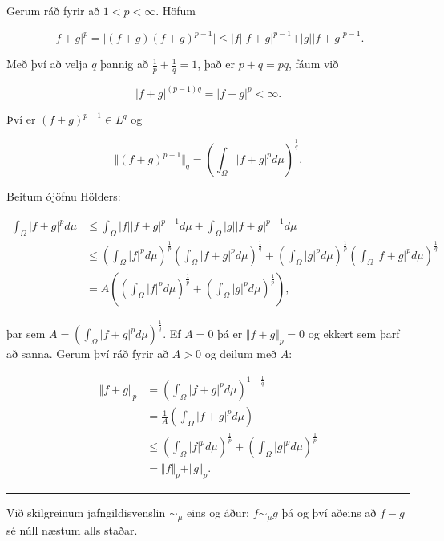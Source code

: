 \documentclass[]{book}
\begin{document}
Gerum ráð fyrir að \(1 < p < \infty\). Höfum

\[
\vert f + g\vert^p =\vert(f + g)(f + g)^{p-1}\vert\leq\vert f\vert\vert f + g\vert^{p-1} + \vert g\vert\vert f + g\vert^{p - 1}.
\]

Með því að velja \(q\) þannig að \(\frac1p + \frac1q = 1\), það er \(p + q = pq\), fáum við

\[
\vert f + g\vert^{(p-1)q} = \vert f + g\vert^p < \infty.
\]

Því er \((f + g)^{p-1}\in L^q\) og

\[
\Vert(f+g)^{p-1}\Vert_q = \left(\int_\Omega\vert f + g\vert^p d\mu \right)^{\frac1q}.
\]

Beitum ójöfnu Hölders:

\[
\begin{aligned}
\int_\Omega\vert f + g\vert^p d\mu &\leq 
\int_\Omega\vert f\vert\vert f + g\vert^{p-1}d\mu + \int_\Omega\vert g\vert\vert f + g\vert^{p-1}d\mu \\
&\leq \left(\int_\Omega \vert f\vert^pd\mu\right)^{\frac1p}\left(\int_\Omega\vert f + g\vert^pd\mu\right)^{\frac 1q}
+ \left(\int_\Omega \vert g\vert^pd\mu\right)^{\frac1p}\left(\int_\Omega\vert f + g\vert^pd\mu\right)^{\frac 1q} \\
&= A\left(\left(\int_\Omega\vert f\vert^pd\mu   \right)^{\frac1p} + \left(\int_\Omega\vert g\vert^pd\mu\right)^{\frac1p}\right),
\end{aligned}
\]

þar sem \(A = \left(\int_\Omega\vert f + g\vert^pd\mu\right)^{\frac1q}\). Ef \(A=0\) þá er \(\Vert f + g\Vert_p = 0\) og ekkert sem þarf að sanna. Gerum því ráð fyrir að \(A>0\) og deilum með \(A\):

\[
\begin{aligned}
\Vert f + g\Vert_p &= \left(\int_\Omega\vert f + g\vert^pd\mu\right)^{1 - \frac1q} \\
&= \frac1A\left(\int_\Omega\vert f + g\vert^pd\mu\right) \\
&\leq \left(\int_\Omega\vert f\vert^pd\mu\right)^{\frac1p} + \left(\int_\Omega\vert g\vert^pd\mu\right)^{\frac1p} \\
&= \Vert f\Vert_p + \Vert g\Vert_p.
\end{aligned}
\]

\begin{center}\rule{0.5\linewidth}{\linethickness}\end{center}

Við skilgreinum jafngildisvenslin \(\sim_\mu\) eins og áður: \(f\sim_\mu g\) þá og því aðeins að \(f - g\) sé núll næstum alls staðar.
\end{document}
